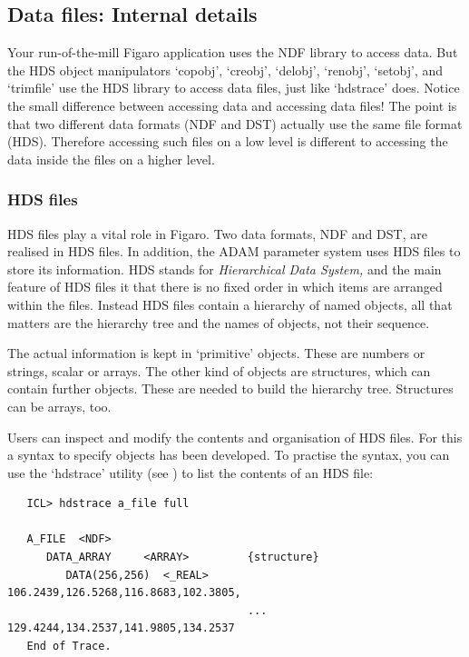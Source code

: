 
\subsection{\label{files}Data files: Internal details}

   Your run-of-the-mill Figaro application uses the NDF library to
   access data. But the HDS object manipulators `copobj', `creobj',
   `delobj', `renobj', `setobj', and `trimfile' use the HDS library to
   access data files, just like `hdstrace' does. Notice the small
   difference between accessing data and accessing data files! The
   point is that two different data formats (NDF and DST) actually use
   the same file format (HDS). Therefore accessing such files on a low
   level is different to accessing the data inside the files on a
   higher level.


\subsubsection{\label{fileshds}HDS files}

   HDS files play a vital role in Figaro. Two data formats, NDF and
   DST, are realised in HDS files. In addition, the ADAM parameter
   system uses HDS files to store its information. HDS stands for
{\em Hierarchical Data System,\/}
   and the main feature of HDS files it that there is no fixed order in
   which items are arranged within the files. Instead HDS files contain
   a hierarchy of named objects, all that matters are the hierarchy tree
   and the names of objects, not their sequence.

   The actual information is kept in `primitive' objects. These are
   numbers or strings, scalar or arrays. The other kind of objects are
   structures, which can contain further objects. These are needed to
   build the hierarchy tree. Structures can be arrays, too.

   Users can inspect and modify the contents and organisation of HDS
   files.  For this a syntax to specify objects has been developed.
   To practise the syntax, you can use the `hdstrace' utility (see
   ) to list the contents of an HDS file:

\begin{verbatim}
   ICL> hdstrace a_file full

   A_FILE  <NDF>
      DATA_ARRAY     <ARRAY>         {structure}
         DATA(256,256)  <_REAL>         106.2439,126.5268,116.8683,102.3805,
                                     ... 129.4244,134.2537,141.9805,134.2537
   End of Trace.
\end{verbatim}

